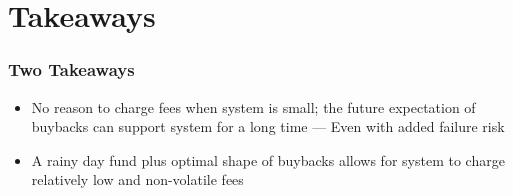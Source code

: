\documentclass[10pt]{beamer}
\begin{document}
\section{Takeaways}

  \begin{frame} \frametitle{Two Takeaways}

    \begin{itemize}
      \item No reason to charge fees when system is small; the future expectation of buybacks can
            support system for a long time --- Even with added failure risk
      \item A rainy day fund plus optimal shape of buybacks allows for system to charge relatively
            low and non-volatile fees
    \end{itemize}

  \end{frame}
\end{document}

